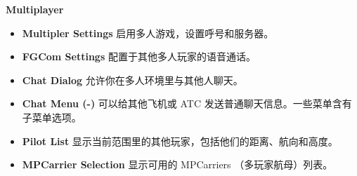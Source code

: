 \ifchinese
\item \textbf{Multiplayer}
 \begin{itemize}
  \item \textbf{Multipler Settings} 启用多人游戏，设置呼号和服务器。
  \item \textbf{FGCom Settings} 配置于其他多人玩家的语音通话。
  \item \textbf{Chat Dialog} 允许你在多人环境里与其他人聊天。
  \item \textbf{Chat Menu (-)} 可以给其他飞机或 ATC 发送普通聊天信息。一些菜单含有子菜单选项。
  \item \textbf{Pilot List} 显示当前范围里的其他玩家，包括他们的距离、航向和高度。
  \item \textbf{MPCarrier Selection} 显示可用的 MPCarriers （多玩家航母）列表。
 \end{itemize}
\fi


